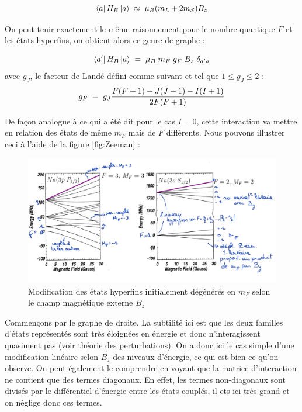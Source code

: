 \begin{equation*}
    \bra{a}H_B\ket{a} \; \approx \; \mu_B(m_L + 2m_S)B_z
\end{equation*}

On peut tenir exactement le même raisonnement pour le nombre quantique $F$ et les états hyperfins, on obtient alors ce genre de graphe :

\begin{equation*}
    \bra{a'}H_B\ket{a} \; = \; \mu_B \; m_F \; g_F \; B_z \;\delta_{a'a}
\end{equation*}
avec $g_J$, le facteur de Landé défini comme suivant et tel que $1\leq g_J \leq 2$ :
\begin{equation*}
    g_F \; = \;  g_J \dfrac{F(F+1) + J(J+1) - I(I+1)}{2F(F+1)} 
\end{equation*}


De façon analogue à ce qui a été dit pour le cas $I=0$, cette interaction va mettre en relation des états de même $m_F$ mais de $F$ différents. Nous pouvons illustrer ceci à l'aide de la figure \eqref{fig:Zeeman} :\\

\begin{figure}[tph]
    \centering
    \includegraphics[width=\textwidth]{Images2/ZeemanHyperfin.PNG}
    \caption{Modification des états hyperfins initialement dégénérés en $m_F$ selon le champ magnétique externe $B_z$}
    \label{fig:Zeeman}
\end{figure}

Commençons par le graphe de droite. La subtilité ici est que les deux familles d'états représentés sont très éloignées en énergie et donc n'interagissent quasiment pas (voir théorie des perturbations). On a donc ici le cas simple d'une modification linéaire selon $B_z$ des niveaux d'énergie, ce qui est bien ce qu'on observe. On peut également le comprendre en voyant que la matrice d'interaction ne contient que des termes diagonaux. En effet, les termes non-diagonaux sont divisés par le différentiel d'énergie entre les états couplés, il ets ici très grand et on néglige donc ces termes.\\

